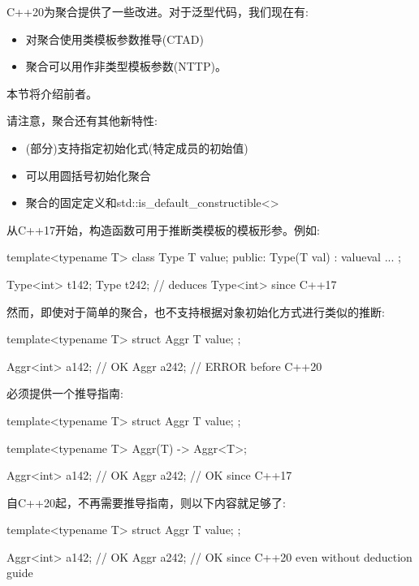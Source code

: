 
C++20为聚合提供了一些改进。对于泛型代码，我们现在有:

\begin{itemize}
\item 
对聚合使用类模板参数推导(CTAD)

\item 
聚合可以用作非类型模板参数(NTTP)。
\end{itemize}

本节将介绍前者。

请注意，聚合还有其他新特性:

\begin{itemize}
\item 
(部分)支持指定初始化式(特定成员的初始值)

\item 
可以用圆括号初始化聚合

\item 
聚合的固定定义和std::is\_default\_constructible<>
\end{itemize}



从C++17开始，构造函数可用于推断类模板的模板形参。例如:

\begin{cpp}
template<typename T>
class Type {
	T value;
public:
	Type(T val)
	: value{val} {
	}
	...
};

Type<int> t1{42};
Type t2{42}; // deduces Type<int> since C++17
\end{cpp}

然而，即使对于简单的聚合，也不支持根据对象初始化方式进行类似的推断:

\begin{cpp}
template<typename T>
struct Aggr {
	T value;
};

Aggr<int> a1{42}; // OK
Aggr a2{42}; // ERROR before C++20
\end{cpp}

必须提供一个推导指南:

\begin{cpp}
template<typename T>
struct Aggr {
	T value;
};

template<typename T>
Aggr(T) -> Aggr<T>;

Aggr<int> a1{42}; // OK
Aggr a2{42}; // OK since C++17
\end{cpp}

自C++20起，不再需要推导指南，则以下内容就足够了:

\begin{cpp}
template<typename T>
struct Aggr {
	T value;
};

Aggr<int> a1{42}; // OK
Aggr a2{42}; // OK since C++20 even without deduction guide
\end{cpp}

